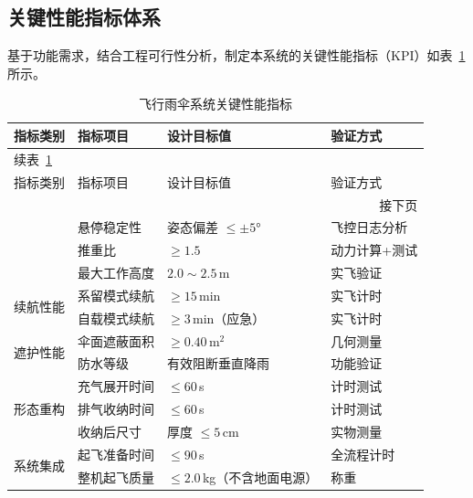 \subsection{关键性能指标体系}

基于功能需求，结合工程可行性分析，制定本系统的关键性能指标（KPI）如表~\ref{tab:kpi}所示。

\begin{longtable}{llll}
    \caption{飞行雨伞系统关键性能指标}
    \label{tab:kpi} \\

    \toprule
    指标类别 & 指标项目 & 设计目标值 & 验证方式 \\
    \midrule
    \endfirsthead

    \multicolumn{4}{l}{\small 续表~\ref*{tab:kpi}} \\[2pt]
    \toprule
    指标类别 & 指标项目 & 设计目标值 & 验证方式 \\
    \midrule
    \endhead

    \midrule
    \multicolumn{4}{r}{\small 接下页} \\
    \endfoot

    \bottomrule
    \endlastfoot

    \multirow{3}{*}{飞行性能}
        & 悬停稳定性   & 姿态偏差 $\leq \pm5°$    & 飞控日志分析 \\
        & 推重比       & $\geq 1.5$               & 动力计算+测试 \\
        & 最大工作高度 & $2.0\sim2.5$\,m          & 实飞验证 \\
    \midrule
    \multirow{2}{*}{续航性能}
        & 系留模式续航 & $\geq 15$\,min           & 实飞计时 \\
        & 自载模式续航 & $\geq 3$\,min（应急）    & 实飞计时 \\
    \midrule
    \multirow{2}{*}{遮护性能}
        & 伞面遮蔽面积 & $\geq 0.40$\,m$^2$       & 几何测量 \\
        & 防水等级     & 有效阻断垂直降雨          & 功能验证 \\
    \midrule
    \multirow{3}{*}{形态重构}
        & 充气展开时间 & $\leq 60$\,s              & 计时测试 \\
        & 排气收纳时间 & $\leq 60$\,s              & 计时测试 \\
        & 收纳后尺寸   & 厚度 $\leq 5$\,cm         & 实物测量 \\
    \midrule
    \multirow{2}{*}{系统集成}
        & 起飞准备时间 & $\leq 90$\,s              & 全流程计时 \\
        & 整机起飞质量 & $\leq 2.0$\,kg（不含地面电源）& 称重 \\

\end{longtable}

